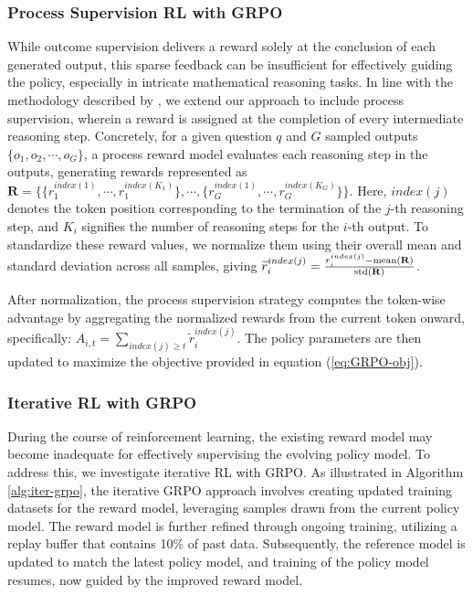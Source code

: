 \begin{itemize}[topsep=0pt]
\begin{itemize}[topsep=0pt]
\subsubsection{Process Supervision RL with GRPO}  
While outcome supervision delivers a reward solely at the conclusion of each generated output, this sparse feedback can be insufficient for effectively guiding the policy, especially in intricate mathematical reasoning tasks. In line with the methodology described by \cite{wang2023math}, we extend our approach to include process supervision, wherein a reward is assigned at the completion of every intermediate reasoning step. Concretely, for a given question $q$ and $G$ sampled outputs $\{o_1, o_2, \cdots, o_G\}$, a process reward model evaluates each reasoning step in the outputs, generating rewards represented as $\mathbf{R} = \{ \{r_1^{index(1)},\cdots,r_1^{index(K_1)}\}, \cdots,  \{r_G^{index(1)},\cdots,r_G^{index(K_G)}\} \}$. Here, $index(j)$ denotes the token position corresponding to the termination of the $j$-th reasoning step, and $K_i$ signifies the number of reasoning steps for the $i$-th output. To standardize these reward values, we normalize them using their overall mean and standard deviation across all samples, giving $\widetilde{r}_i^{index(j)} = \frac{r_i^{index(j)} - {\rm mean(\mathbf{R})}}{{\rm std(\mathbf{R})}}$.

After normalization, the process supervision strategy computes the token-wise advantage by aggregating the normalized rewards from the current token onward, specifically: $\hat{A}_{i, t} = \sum_{index(j) \ge t} \widetilde{r}_i^{index(j)}$. The policy parameters are then updated to maximize the objective provided in equation (\ref{eq:GRPO-obj}).

\subsubsection{Iterative RL with GRPO} During the course of reinforcement learning, the existing reward model may become inadequate for effectively supervising the evolving policy model. To address this, we investigate iterative RL with GRPO. As illustrated in Algorithm \ref{alg:iter-grpo}, the iterative GRPO approach involves creating updated training datasets for the reward model, leveraging samples drawn from the current policy model. The reward model is further refined through ongoing training, utilizing a replay buffer that contains 10\% of past data. Subsequently, the reference model is updated to match the latest policy model, and training of the policy model resumes, now guided by the improved reward model.


\end{itemize}
\end{itemize}
